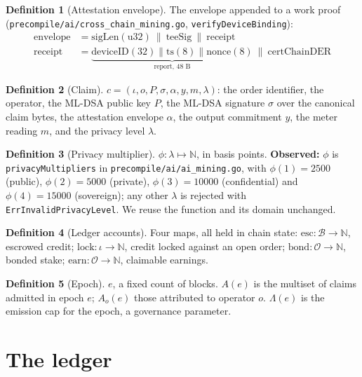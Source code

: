 \documentclass[11pt,a4paper]{article}
\theoremstyle{definition}
\newtheorem{definition}{Definition}[section]
\theoremstyle{remark}
\newcommand{\code}[1]{\texttt{#1}}
\newcommand{\Claim}{c}
\newcommand{\Ops}{\mathcal{O}}
\newcommand{\Buyers}{\mathcal{B}}
\begin{document}
\begin{definition}[Attestation envelope]
The envelope appended to a work proof
(\code{precompile/ai/cross\_chain\_mining.go}, \code{verifyDeviceBinding}):
\begin{align*}
\text{envelope} &= \text{sigLen}(\text{u32})\ \|\ \text{teeSig}\ \|\ \text{receipt}\\
\text{receipt} &= \underbrace{\text{deviceID}(32)\|\text{ts}(8)\|\text{nonce}(8)}_{\text{report, 48 B}}\ \|\ \text{certChainDER}
\end{align*}
\end{definition}

\begin{definition}[Claim]
$\Claim = (\iota, o, P, \sigma, \alpha, y, m, \lambda)$: the order identifier,
the operator, the ML-DSA public key $P$, the ML-DSA signature $\sigma$ over the
canonical claim bytes, the attestation envelope $\alpha$, the output commitment
$y$, the meter reading $m$, and the privacy level $\lambda$.
\end{definition}

\begin{definition}[Privacy multiplier]
$\phi: \lambda \mapsto \mathbb{N}$, in basis points. \textbf{Observed:}
$\phi$ is \code{privacyMultipliers} in \code{precompile/ai/ai\_mining.go}, with
$\phi(1) = 2500$ (public), $\phi(2) = 5000$ (private), $\phi(3) = 10000$
(confidential) and $\phi(4) = 15000$ (sovereign); any other $\lambda$ is
rejected with \code{ErrInvalidPrivacyLevel}. We reuse the function and its
domain unchanged.
\end{definition}

\begin{definition}[Ledger accounts]
Four maps, all held in chain state:
$\mathrm{esc}: \Buyers \to \mathbb{N}$, escrowed credit;
$\mathrm{lock}: \iota \to \mathbb{N}$, credit locked against an open order;
$\mathrm{bond}: \Ops \to \mathbb{N}$, bonded stake;
$\mathrm{earn}: \Ops \to \mathbb{N}$, claimable earnings.
\end{definition}

\begin{definition}[Epoch]
$e$, a fixed count of blocks. $A(e)$ is the multiset of claims admitted in
epoch $e$; $A_o(e)$ those attributed to operator $o$. $\Lambda(e)$ is the
emission cap for the epoch, a governance parameter.
\end{definition}

\section{The ledger}
\label{sec:ledger}
\end{document}

